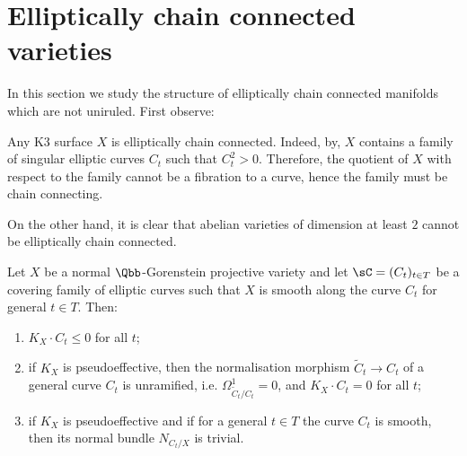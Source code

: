 \section{Elliptically chain connected varieties}\label{sec:ellchainconn}

In this section we study the structure of elliptically chain connected manifolds which are not uniruled. First observe:

\begin{rema}\label{rema:main5.1}
Any K3 surface $X$ is elliptically chain connected. Indeed, by\linebreak\cite[Corollary~13.2.2]{Huy16}, $X$ contains a family of singular elliptic curves $C_t$ such that $C_t^2 > 0$. Therefore, the quotient of $X$ with respect to the family cannot be a fibration to a curve, hence the family must be chain connecting.
\end{rema}

On the other hand, it is clear that abelian varieties of dimension at least $2$ cannot be elliptically chain connected.

\begin{prop}\label{prop:etale}
Let $X$ be a normal $\Qbb$-Gorenstein projective variety and let $\sC = (C_t)_{t\in T} $ be a covering family of elliptic curves such that $X$ is smooth along the curve $C_t$ for general $t\in T$. Then:
\begin{enumerate}\romanenumi
\item \label{list-5.2.1}$K_X \cdot C_t \leq 0$ for all $t$;
\item \label{list-5.2.2}if $K_X$ is pseudoeffective, then the normalisation morphism $\widetilde C_t \to C_t$ of a general curve $C_t$ is unramified, i.e.
$\Omega^1_{\widetilde C_t/C_t} = 0$, and $K_X \cdot C_t = 0$ for all $t$;
\item \label{list-5.2.3}if $K_X$ is pseudoeffective and if for a general $t\in T$ the curve $C_t$ is smooth, then its normal bundle $N_{C_t/X}$ is trivial.
\end{enumerate}
\end{prop}

